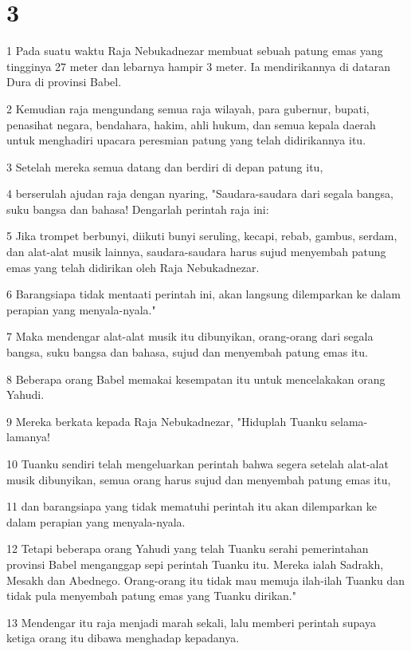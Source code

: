 \chapter{3}

\par 1 Pada suatu waktu Raja Nebukadnezar membuat sebuah patung emas yang tingginya 27 meter dan lebarnya hampir 3 meter. Ia mendirikannya di dataran Dura di provinsi Babel.
\par 2 Kemudian raja mengundang semua raja wilayah, para gubernur, bupati, penasihat negara, bendahara, hakim, ahli hukum, dan semua kepala daerah untuk menghadiri upacara peresmian patung yang telah didirikannya itu.
\par 3 Setelah mereka semua datang dan berdiri di depan patung itu,
\par 4 berserulah ajudan raja dengan nyaring, "Saudara-saudara dari segala bangsa, suku bangsa dan bahasa! Dengarlah perintah raja ini:
\par 5 Jika trompet berbunyi, diikuti bunyi seruling, kecapi, rebab, gambus, serdam, dan alat-alat musik lainnya, saudara-saudara harus sujud menyembah patung emas yang telah didirikan oleh Raja Nebukadnezar.
\par 6 Barangsiapa tidak mentaati perintah ini, akan langsung dilemparkan ke dalam perapian yang menyala-nyala."
\par 7 Maka mendengar alat-alat musik itu dibunyikan, orang-orang dari segala bangsa, suku bangsa dan bahasa, sujud dan menyembah patung emas itu.
\par 8 Beberapa orang Babel memakai kesempatan itu untuk mencelakakan orang Yahudi.
\par 9 Mereka berkata kepada Raja Nebukadnezar, "Hiduplah Tuanku selama-lamanya!
\par 10 Tuanku sendiri telah mengeluarkan perintah bahwa segera setelah alat-alat musik dibunyikan, semua orang harus sujud dan menyembah patung emas itu,
\par 11 dan barangsiapa yang tidak mematuhi perintah itu akan dilemparkan ke dalam perapian yang menyala-nyala.
\par 12 Tetapi beberapa orang Yahudi yang telah Tuanku serahi pemerintahan provinsi Babel menganggap sepi perintah Tuanku itu. Mereka ialah Sadrakh, Mesakh dan Abednego. Orang-orang itu tidak mau memuja ilah-ilah Tuanku dan tidak pula menyembah patung emas yang Tuanku dirikan."
\par 13 Mendengar itu raja menjadi marah sekali, lalu memberi perintah supaya ketiga orang itu dibawa menghadap kepadanya.
